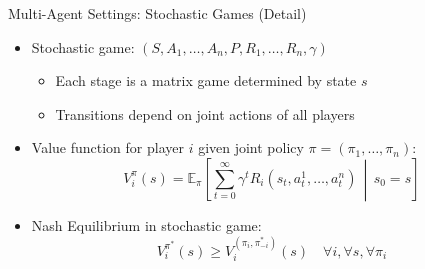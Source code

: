 \documentclass[10pt]{beamer}
\newcommand{\E}{\mathbb{E}}
\begin{document}

\begin{frame}{Multi-Agent Settings: Stochastic Games (Detail)}
    \begin{itemize}
        \item Stochastic game: $(S, A_1, \ldots, A_n, P, R_1, \ldots, R_n, \gamma)$
        \begin{itemize}
            \item Each stage is a matrix game determined by state $s$
            \item Transitions depend on joint actions of all players
        \end{itemize}
        \vspace{0.2cm}
        \item Value function for player $i$ given joint policy $\pi = (\pi_1, \ldots, \pi_n)$:
        \begin{equation}
            V_i^{\pi}(s) = \E_{\pi}\left[\sum_{t=0}^{\infty} \gamma^t R_i(s_t, a_t^1, \ldots, a_t^n) \,\middle|\, s_0 = s\right]
        \end{equation}
        \vspace{0.2cm}
        \item Nash Equilibrium in stochastic game:
        \begin{equation}
            V_i^{\pi^*}(s) \geq V_i^{(\pi_i, \pi_{-i}^*)}(s) \quad \forall i, \forall s, \forall \pi_i
        \end{equation}
    \end{itemize}
\end{frame}

\end{document}
